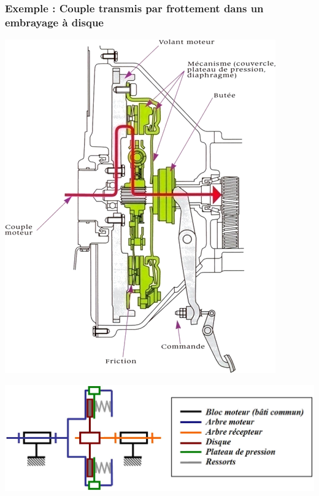 \documentclass[10pt]{article}
\begin{document}
\subsubsection{Exemple : Couple transmis par frottement dans un embrayage à disque}

\begin{minipage}[c]{.3\linewidth}
\begin{center}
\includegraphics[width=.95\textwidth]{images/embrayage}
\end{center}
\end{minipage}\hfill
\begin{minipage}[c]{.65\linewidth}
\begin{center}
\includegraphics[width=.95\textwidth]{images/embrayage2}
\end{center}
\end{minipage}
\end{document}

